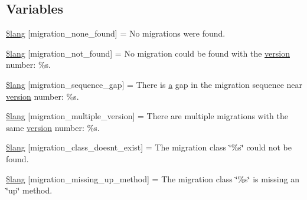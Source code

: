 \subsection*{Variables}
\begin{DoxyCompactItemize}
\item 
\hyperlink{system_2language_2english_2migration__lang_8php_affa6337f0973de810b3c61491deae6b1}{\$lang} \mbox{[}\textquotesingle{}migration\+\_\+none\+\_\+found\textquotesingle{}\mbox{]} = \textquotesingle{}No migrations were found.\textquotesingle{}
\item 
\hyperlink{system_2language_2english_2migration__lang_8php_a92dd777422d70950993d43f4d0c31b1b}{\$lang} \mbox{[}\textquotesingle{}migration\+\_\+not\+\_\+found\textquotesingle{}\mbox{]} = \textquotesingle{}No migration could be found with the \hyperlink{_admin_2assets_2js_2bootstrap_8js_a614229fff4211edebc3c193d1e7763ec}{version} number\+: \%s.\textquotesingle{}
\item 
\hyperlink{system_2language_2english_2migration__lang_8php_ab1f43d98bc1365f4b753d783a8802697}{\$lang} \mbox{[}\textquotesingle{}migration\+\_\+sequence\+\_\+gap\textquotesingle{}\mbox{]} = \textquotesingle{}There is \hyperlink{_admin_2assets_2js_2bootstrap_8min_8js_a1f5870dcf487187f13d5fd328ed9e6e7}{a} gap in the migration sequence near \hyperlink{_admin_2assets_2js_2bootstrap_8js_a614229fff4211edebc3c193d1e7763ec}{version} number\+: \%s.\textquotesingle{}
\item 
\hyperlink{system_2language_2english_2migration__lang_8php_a1a98130d04f280e6a5f6f509179f9e01}{\$lang} \mbox{[}\textquotesingle{}migration\+\_\+multiple\+\_\+version\textquotesingle{}\mbox{]} = \textquotesingle{}There are multiple migrations with the same \hyperlink{_admin_2assets_2js_2bootstrap_8js_a614229fff4211edebc3c193d1e7763ec}{version} number\+: \%s.\textquotesingle{}
\item 
\hyperlink{system_2language_2english_2migration__lang_8php_a141dceda5b8294f6e4ddf7e5da6fe71d}{\$lang} \mbox{[}\textquotesingle{}migration\+\_\+class\+\_\+doesnt\+\_\+exist\textquotesingle{}\mbox{]} = \textquotesingle{}The migration class \char`\"{}\%s\char`\"{} could not be found.\textquotesingle{}
\item 
\hyperlink{system_2language_2english_2migration__lang_8php_a4bc9c60a4f078d1845d1d72370c363e8}{\$lang} \mbox{[}\textquotesingle{}migration\+\_\+missing\+\_\+up\+\_\+method\textquotesingle{}\mbox{]} = \textquotesingle{}The migration class \char`\"{}\%s\char`\"{} is missing an \char`\"{}up\char`\"{} method.\textquotesingle{}

\end{DoxyCompactItemize}
